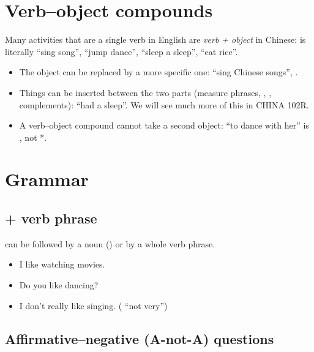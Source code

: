 \section{Verb--object compounds}

Many activities that are a single verb in English are \emph{verb + object} in Chinese:
 is literally ``sing song'',  ``jump dance'',  ``sleep a
sleep'',  ``eat rice''.

\begin{important}
\begin{itemize}
  \item The object can be replaced by a more specific one:  ``sing Chinese
        songs'', .
  \item Things can be inserted between the two parts (measure phrases, , ,
        complements):  ``had a sleep''. We will see much more of this in
        CHINA 102R.
  \item A verb--object compound cannot take a second object: ``to dance with her'' is
        , not *.
\end{itemize}
\end{important}

\section{Grammar}

\subsection{ + verb phrase}

 can be followed by a noun () or by a whole verb phrase.
\begin{itemize}
  \item {} I like watching movies.
  \item {} Do you like dancing?
  \item {} I don't really like singing. ( ``not very'')
\end{itemize}

\subsection{Affirmative--negative (A-not-A) questions}

